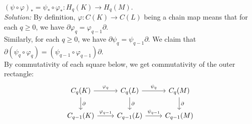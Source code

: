 \documentclass[a4paper]{article}
\begin{document}
    $\left( \psi \circ \varphi \right)_*
    = \psi_* \circ \varphi_*  \colon
    H_q(K) \to H_q(M)$.\\
    \linebreak
    \textit{Solution:} By definition, $\varphi  \colon C(K) \to C(L)$ being
    a chain map means that for each $q \ge 0$, we have
    $\partial \varphi_q = \varphi_{q-1} \partial$.\\
    Similarly, for each $q\ge 0$, we have
    $\partial \psi_q = \psi_{q-1} \partial$. We claim that
    $\partial \left( \psi_q \circ \varphi_q \right) 
    = \left( \psi_{q-1}\circ \varphi_{q-1} \right) \partial$.\\
    By commutativity of each square below, we get commutativity of the outer
    rectangle:
    \begin{equation*}
    \begin{tikzcd}
        C_q(K) \arrow[r, "\varphi_q"] \arrow[d, "\partial"] & C_q (L) \arrow[d,
        "\partial"] \arrow[r, "\psi_q"] & C_{q}(M)
        \arrow[d, "\partial"]\\
        C_{q-1}(K) \arrow[r, "\varphi_{q-1}"] & C_{q-1}(L) \arrow[r,
        "\psi_{q-1}"] & C_{q-1}(M)
    \end{tikzcd}
    \end{equation*}
    
\end{document}
